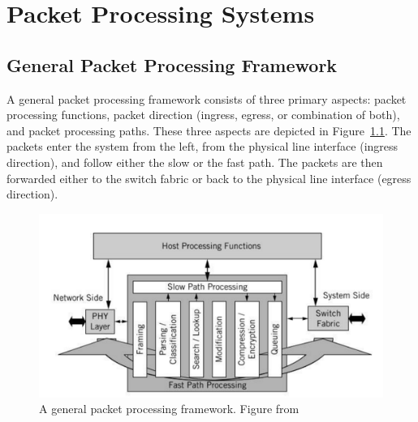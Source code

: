 \chapter{Packet Processing Systems}
\label{chapter:packet-processing-systems}

\section{General Packet Processing Framework}

A general packet processing framework consists of three primary aspects: packet processing functions, packet direction (ingress, egress, or combination of both), and packet processing paths. These three aspects are depicted in Figure~\ref{fig:general-packet-processing-framework}. The packets enter the system from the left, from the physical line interface (ingress direction), and follow either the slow or the fast path. The packets are then forwarded either to the switch fabric or back to the physical line interface (egress direction).~\cite{Giladi:2008:Network}

\begin{figure}[]
  \begin{center}
    \includegraphics[width=\textwidth]{images/general-packet-processing-framework.png}
    \caption{A general packet processing framework. Figure from~\cite{Giladi:2008:Network}}
    \label{fig:general-packet-processing-framework}
  \end{center}
\end{figure}

